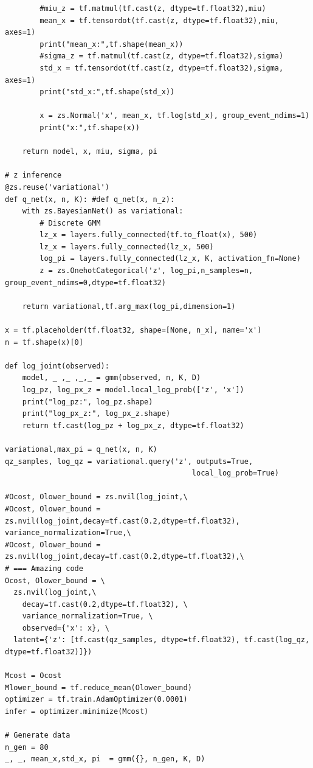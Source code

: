 \documentclass[a4paper]{article}
\begin{document}
\begin{verbatim}
        #miu_z = tf.matmul(tf.cast(z, dtype=tf.float32),miu)
        mean_x = tf.tensordot(tf.cast(z, dtype=tf.float32),miu, axes=1)
        print("mean_x:",tf.shape(mean_x))
        #sigma_z = tf.matmul(tf.cast(z, dtype=tf.float32),sigma)
        std_x = tf.tensordot(tf.cast(z, dtype=tf.float32),sigma, axes=1)
        print("std_x:",tf.shape(std_x))
        
        x = zs.Normal('x', mean_x, tf.log(std_x), group_event_ndims=1)
        print("x:",tf.shape(x))

    return model, x, miu, sigma, pi

# z inference
@zs.reuse('variational')
def q_net(x, n, K): #def q_net(x, n_z):
    with zs.BayesianNet() as variational:
        # Discrete GMM
        lz_x = layers.fully_connected(tf.to_float(x), 500)
        lz_x = layers.fully_connected(lz_x, 500)
        log_pi = layers.fully_connected(lz_x, K, activation_fn=None)
        z = zs.OnehotCategorical('z', log_pi,n_samples=n,  group_event_ndims=0,dtype=tf.float32)

    return variational,tf.arg_max(log_pi,dimension=1)

x = tf.placeholder(tf.float32, shape=[None, n_x], name='x')
n = tf.shape(x)[0]

def log_joint(observed):
    model, _ ,_ ,_,_ = gmm(observed, n, K, D)
    log_pz, log_px_z = model.local_log_prob(['z', 'x'])
    print("log_pz:", log_pz.shape)
    print("log_px_z:", log_px_z.shape)
    return tf.cast(log_pz + log_px_z, dtype=tf.float32)

variational,max_pi = q_net(x, n, K)
qz_samples, log_qz = variational.query('z', outputs=True,
                                           local_log_prob=True)

#Ocost, Olower_bound = zs.nvil(log_joint,\
#Ocost, Olower_bound = zs.nvil(log_joint,decay=tf.cast(0.2,dtype=tf.float32), variance_normalization=True,\
#Ocost, Olower_bound = zs.nvil(log_joint,decay=tf.cast(0.2,dtype=tf.float32),\
# === Amazing code
Ocost, Olower_bound = \
  zs.nvil(log_joint,\
    decay=tf.cast(0.2,dtype=tf.float32), \
    variance_normalization=True, \
    observed={'x': x}, \
  latent={'z': [tf.cast(qz_samples, dtype=tf.float32), tf.cast(log_qz, dtype=tf.float32)]})

Mcost = Ocost
Mlower_bound = tf.reduce_mean(Olower_bound)
optimizer = tf.train.AdamOptimizer(0.0001)
infer = optimizer.minimize(Mcost)

# Generate data
n_gen = 80
_, _, mean_x,std_x, pi  = gmm({}, n_gen, K, D)


\end{verbatim}
\end{document}
